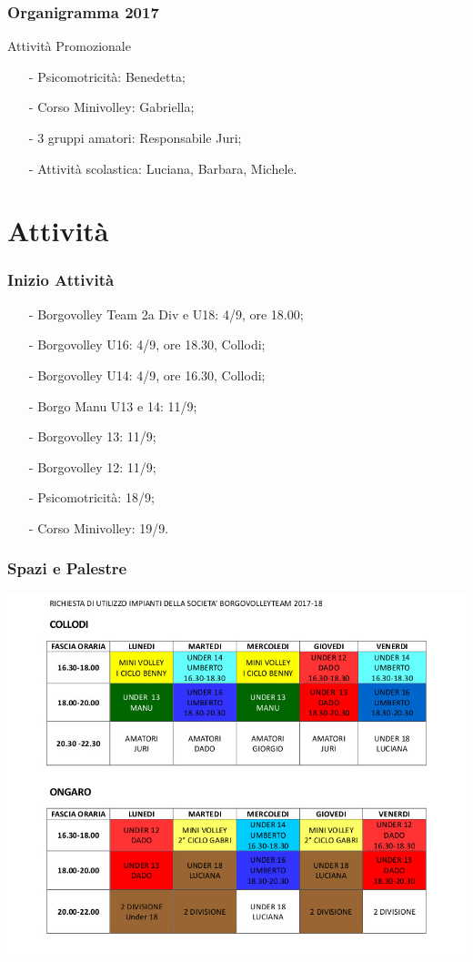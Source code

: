 \documentclass{beamer}
\begin{document}
\begin{frame}
\frametitle{Organigramma 2017}
\begin{block}{Attività Promozionale}
\begin{itemize}
\item[-]Psicomotricità: Benedetta;
\item[-]Corso Minivolley: Gabriella;
\item[-]3 gruppi amatori: Responsabile Juri;
\item[-]Attività scolastica: Luciana, Barbara, Michele.
\end{itemize}
\end{block}
\end{frame}


\section{Attività}


\begin{frame}
\frametitle{Inizio Attività}
\begin{itemize}
\item[-]Borgovolley Team 2a Div e U18: 4/9, ore 18.00;
\item[-]Borgovolley U16: 4/9, ore 18.30, Collodi;
\item[-]Borgovolley U14: 4/9, ore 16.30, Collodi;
\item[-]Borgo Manu U13 e 14: 11/9;
\item[-]Borgovolley 13: 11/9;
\item[-]Borgovolley 12: 11/9;
\item[-]Psicomotricità: 18/9;
\item[-]Corso Minivolley: 19/9.
\end{itemize}
\end{frame}


\begin{frame}
\frametitle{Spazi e Palestre}
\begin{center}
\includegraphics[scale=0.47]{palestre2017-18.jpg}
\end{center}
\end{frame}
\end{document}
